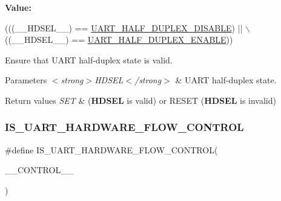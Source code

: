 {\bfseries Value\+:}
\begin{DoxyCode}
(((\_\_HDSEL\_\_) == \hyperlink{group___u_a_r_t___half___duplex___selection_ga282d253c045fd9a3785c6c3e3293346c}{UART\_HALF\_DUPLEX\_DISABLE}) || \(\backslash\)
                                            ((\_\_HDSEL\_\_) == 
      \hyperlink{group___u_a_r_t___half___duplex___selection_ga61e92cc4435c05d850f9fd5456f391e6}{UART\_HALF\_DUPLEX\_ENABLE}))
\end{DoxyCode}


Ensure that U\+A\+RT half-\/duplex state is valid. 


\begin{DoxyParams}{Parameters}
{\em $<$strong$>$\+H\+D\+S\+E\+L$<$/strong$>$} & U\+A\+RT half-\/duplex state. \\
\hline
\end{DoxyParams}

\begin{DoxyRetVals}{Return values}
{\em S\+ET} & ({\bfseries H\+D\+S\+EL} is valid) or R\+E\+S\+ET ({\bfseries H\+D\+S\+EL} is invalid) \\
\hline
\end{DoxyRetVals}
\mbox{\label{group___u_a_r_t___private___macros_ga92977d9daf0c39d875df200ae0ae6acd}} 
\subsubsection{\texorpdfstring{I\+S\+\_\+\+U\+A\+R\+T\+\_\+\+H\+A\+R\+D\+W\+A\+R\+E\+\_\+\+F\+L\+O\+W\+\_\+\+C\+O\+N\+T\+R\+OL}{IS\_UART\_HARDWARE\_FLOW\_CONTROL}}
{\footnotesize\ttfamily \#define I\+S\+\_\+\+U\+A\+R\+T\+\_\+\+H\+A\+R\+D\+W\+A\+R\+E\+\_\+\+F\+L\+O\+W\+\_\+\+C\+O\+N\+T\+R\+OL(\begin{DoxyParamCaption}\item[{}]{\+\_\+\+\_\+\+C\+O\+N\+T\+R\+O\+L\+\_\+\+\_\+ }\end{DoxyParamCaption})}


